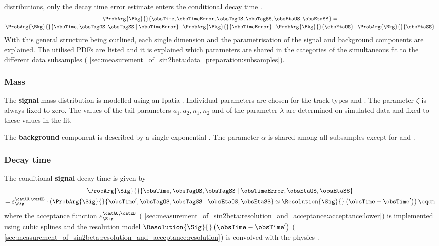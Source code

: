 distributions, only the decay time error estimate enters the conditional decay
time \PDF.
%
\begin{multline}
  \ProbArg{\Bkg}{}{\obsTime, \obsTimeError, \obsTagOS, \obsTagSS, \obsEtaOS, \obsEtaSS} = \\ 
  \ProbArg{\Bkg}{}{\obsTime, \obsTagOS, \obsTagSS \mid \obsTimeError} \cdot
  \ProbArg{\Bkg}{}{\obsTimeError} \cdot
  \ProbArg{\Bkg}{}{\obsEtaOS} \cdot
  \ProbArg{\Bkg}{}{\obsEtaSS}
\end{multline}
%
With this general structure being outlined, each single dimension and the
parametrisation of the signal and background components are explained. The
utilised \acp{PDF} are listed and it is explained which parameters are shared in
the categories of the simultaneous fit to the different data subsamples (\cf
\cref{sec:measurement_of_sin2beta:data_preparation:subsamples}).

\subsubsection{Mass}
\label{sec:measurement_of_sin2beta:likelihood_fit:model:mass}

The \textbf{signal} mass distribution is modelled using an Ipatia \PDF.
Individual parameters are chosen for the track types \catDD and \catLL. The
parameter $\zeta$ is always fixed to zero. The values of the tail parameters
$a_1, a_2, n_1, n_2$ and of the parameter $\lambda$ are determined on simulated
data and fixed to these values in the fit.

The \textbf{background} component is described by a single exponential \PDF. The
parameter $\alpha$ is shared among all subsamples except for \catDD and \catLL.

\subsubsection{Decay time}
\label{sec:measurement_of_sin2beta:likelihood_fit:model:decay_time}

The conditional \textbf{signal} decay time \PDF is given by
%
\begin{multline}
    \ProbArg{\Sig}{}{\obsTime, \obsTagOS, \obsTagSS \mid \obsTimeError, \obsEtaOS, \obsEtaSS} \\ 
  = \varepsilon_{\Sig}^{\text{\catAU,\catEB}} \cdot \left(\ProbArg{\Sig}{}{\obsTime^\prime, \obsTagOS, \obsTagSS \mid \obsEtaOS, \obsEtaSS} \otimes \Resolution{\Sig}{}\left(\obsTime-\obsTime^\prime\right)\right)\eqcm
\end{multline}
%
where the acceptance function $\varepsilon_{\Sig}^{\text{\catAU,\catEB}}$ (\cf
\cref{sec:measurement_of_sin2beta:resolution_and_acceptance:acceptance:lower})
is implemented using cubic splines \cite{Karbach:2014qba} and the resolution
model $\Resolution{\Sig}{}\left(\obsTime-\obsTime^\prime\right)$ (\cf
\cref{sec:measurement_of_sin2beta:resolution_and_acceptance:resolution}) is
convolved with the \B physics \PDF.

